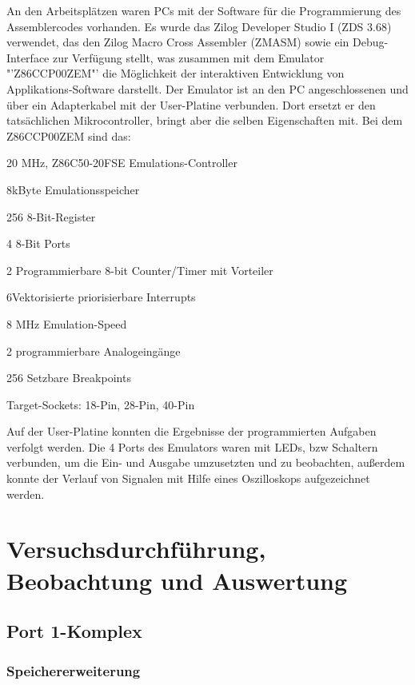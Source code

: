 An den Arbeitsplätzen waren PCs mit der Software für die Programmierung des Assemblercodes vorhanden. Es wurde das Zilog Developer Studio I (ZDS 3.68) verwendet, das den Zilog Macro Cross Assembler (ZMASM) sowie ein Debug-Interface zur Verfügung stellt, was zusammen mit dem Emulator "'Z86CCP00ZEM"' die Möglichkeit der interaktiven Entwicklung von Applikations-Software darstellt. Der Emulator ist an den PC angeschlossenen und über ein Adapterkabel mit der User-Platine verbunden. Dort ersetzt er den tatsächlichen Mikrocontroller, bringt aber die selben Eigenschaften mit. Bei dem Z86CCP00ZEM sind das:
\begin{compactitem} 
\item 20 MHz, Z86C50-20FSE Emulations-Controller
\item 8kByte Emulationsspeicher
\item 256 8-Bit-Register
\item 4 8-Bit Ports
\item 2 Programmierbare 8-bit Counter/Timer mit Vorteiler 
\item 6Vektorisierte priorisierbare Interrupts
\item 8 MHz Emulation-Speed
\item 2 programmierbare Analogeingänge
\item 256 Setzbare Breakpoints
\item Target-Sockets: 18-Pin, 28-Pin, 40-Pin
\end{compactitem}
Auf der User-Platine konnten die Ergebnisse der programmierten Aufgaben verfolgt werden. Die 4 Ports des Emulators waren mit LEDs, bzw Schaltern verbunden, um die Ein- und Ausgabe umzusetzten und zu beobachten, außerdem konnte der Verlauf von Signalen mit Hilfe eines Oszilloskops aufgezeichnet werden. 

\section{Versuchsdurchführung, Beobachtung und Auswertung}
\subsection{Port 1-Komplex}
\subsubsection{Speichererweiterung}

